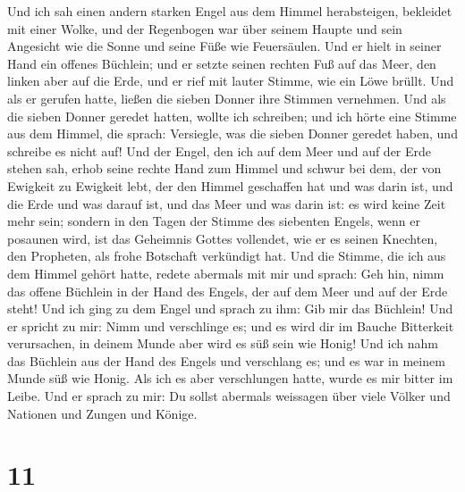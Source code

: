  Und ich sah einen andern starken Engel aus dem Himmel
herabsteigen, bekleidet mit einer Wolke, und der Regenbogen war über
seinem Haupte und sein Angesicht wie die Sonne und seine Füße wie
Feuersäulen.  Und er hielt in seiner Hand ein offenes
Büchlein; und er setzte seinen rechten Fuß auf das Meer, den linken aber
auf die Erde,  und er rief mit lauter Stimme, wie ein Löwe
brüllt. Und als er gerufen hatte, ließen die sieben Donner ihre Stimmen
vernehmen.  Und als die sieben Donner geredet hatten,
wollte ich schreiben; und ich hörte eine Stimme aus dem Himmel, die
sprach: Versiegle, was die sieben Donner geredet haben, und schreibe es
nicht auf!  Und der Engel, den ich auf dem Meer und auf
der Erde stehen sah, erhob seine rechte Hand zum Himmel 
und schwur bei dem, der von Ewigkeit zu Ewigkeit lebt, der den Himmel
geschaffen hat und was darin ist, und die Erde und was darauf ist, und
das Meer und was darin ist: es wird keine Zeit mehr sein; 
sondern in den Tagen der Stimme des siebenten Engels, wenn er posaunen
wird, ist das Geheimnis Gottes vollendet, wie er es seinen Knechten, den
Propheten, als frohe Botschaft verkündigt hat.  Und die
Stimme, die ich aus dem Himmel gehört hatte, redete abermals mit mir und
sprach: Geh hin, nimm das offene Büchlein in der Hand des Engels, der
auf dem Meer und auf der Erde steht!  Und ich ging zu dem
Engel und sprach zu ihm: Gib mir das Büchlein! Und er spricht zu mir:
Nimm und verschlinge es; und es wird dir im Bauche Bitterkeit
verursachen, in deinem Munde aber wird es süß sein wie Honig!
 Und ich nahm das Büchlein aus der Hand des Engels und
verschlang es; und es war in meinem Munde süß wie Honig. Als ich es aber
verschlungen hatte, wurde es mir bitter im Leibe.  Und er
sprach zu mir: Du sollst abermals weissagen über viele Völker und
Nationen und Zungen und Könige.

\hypertarget{section-10}{%
\section{11}\label{section-10}}

